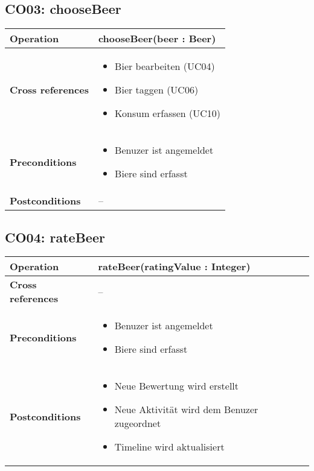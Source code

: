\documentclass[10pt,a4paper]{scrartcl}
\begin{document}
\subsection{CO03: chooseBeer}
\begin{tabular}{|l|p{}|}
\hline
 \textbf{Operation} & chooseBeer(beer : Beer) \\ 
\hline
\textbf{Cross references} & \begin{itemize}
								\item Bier bearbeiten (UC04)
								\item Bier taggen (UC06)
								\item Konsum erfassen (UC10)
						    \end{itemize} \\ 
\hline 
\textbf{Preconditions} & \begin{itemize}
							\item Benuzer ist angemeldet
							\item Biere sind erfasst 
						 \end{itemize} \\
\hline 
\textbf{Postconditions} & -- \\
\hline
\end{tabular}

\subsection{CO04: rateBeer}
\begin{tabular}{|l|p{}|}
\hline
 \textbf{Operation} & rateBeer(ratingValue : Integer) \\ 
\hline
\textbf{Cross references} & -- \\ 
\hline 
\textbf{Preconditions} & \begin{itemize}
							\item Benuzer ist angemeldet
							\item Biere sind erfasst 
						 \end{itemize}\\
\hline 
\textbf{Postconditions} & \begin{itemize}
							\item Neue Bewertung wird erstellt
							\item Neue Aktivität wird dem Benuzer zugeordnet
							\item Timeline wird aktualisiert 
						  \end{itemize} \\
\hline
\end{tabular}
\end{document}
